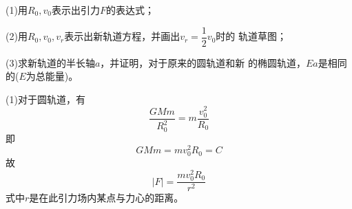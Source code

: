 (1)用$ R _ { 0 }  , v _ { 0 }  $表示出引力$ F $的表达式；

(2)用$ R _ { 0 } , v _ { 0 }  , v _ { r }  $表示出新轨道方程，并画出$ v _ { r } = \dfrac { 1 } { 2 } v _ { 0 } $时的
轨道草图；

(3)求新轨道的半长轴$ a $，并证明，对于原来的圆轨道和新
的椭圆轨道，$ Ea $是相同的($ E $为总能量)。

\solution (1)对于圆轨道，有
\begin{equation*}
  \frac { G M m } { R _ 0 ^ { 2 } } = m \frac { v _ 0 ^ { 2 } } { R _ { 0 } }
\end{equation*}
即\vspace{-1.56em}
\begin{equation*}
  G M m = m v _ 0 ^ { 2 } R _ { 0 } = C
\end{equation*}
故\vspace{-1.56em}
\begin{equation*}
  | F | = \frac { m v _ 0 ^ { 2 } R _ { 0 } } { r ^ { 2 } }
\end{equation*}
式中$ r $是在此引力场内某点与力心的距离。

